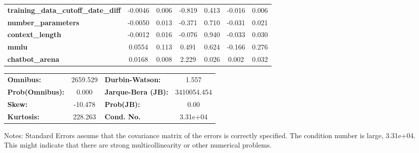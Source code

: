 \begin{center}
\begin{tabular}{lcccccc}
\textbf{training\_data\_cutoff\_date\_diff} &      -0.0046  &        0.006     &    -0.819  &         0.413        &       -0.016    &        0.006     \\
\textbf{number\_parameters}                 &      -0.0050  &        0.013     &    -0.371  &         0.710        &       -0.031    &        0.021     \\
\textbf{context\_length}                    &      -0.0012  &        0.016     &    -0.076  &         0.940        &       -0.033    &        0.030     \\
\textbf{mmlu}                               &       0.0554  &        0.113     &     0.491  &         0.624        &       -0.166    &        0.276     \\
\textbf{chatbot\_arena}                     &       0.0168  &        0.008     &     2.229  &         0.026        &        0.002    &        0.032     \\
\bottomrule
\end{tabular}
\begin{tabular}{lclc}
\textbf{Omnibus:}       & 2659.529 & \textbf{  Durbin-Watson:     } &      1.557   \\
\textbf{Prob(Omnibus):} &   0.000  & \textbf{  Jarque-Bera (JB):  } & 3410054.454  \\
\textbf{Skew:}          & -10.478  & \textbf{  Prob(JB):          } &       0.00   \\
\textbf{Kurtosis:}      & 228.263  & \textbf{  Cond. No.          } &   3.31e+04   \\
\bottomrule
\end{tabular}
\end{center}

Notes: \newline
 [1] Standard Errors assume that the covariance matrix of the errors is correctly specified. \newline
 [2] The condition number is large, 3.31e+04. This might indicate that there are \newline
 strong multicollinearity or other numerical problems.